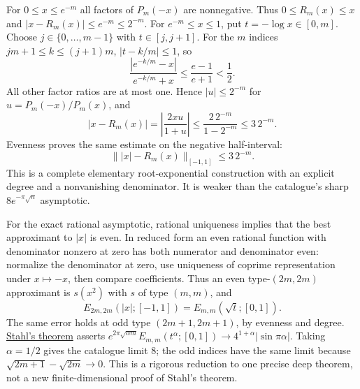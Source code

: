 \documentclass[11pt]{article}
\theoremstyle{remark}
\numberwithin{equation}{section}
\begin{document}
For $0\le x\le e^{-m}$ all factors of $P_m(-x)$ are nonnegative.
Thus $0\le R_m(x)\le x$ and $|x-R_m(x)|\le e^{-m}\le2^{-m}$.
For $e^{-m}\le x\le1$, put $t=-\log x\in[0,m]$.
Choose $j\in\{0,\ldots,m-1\}$ with $t\in[j,j+1]$.
For the $m$ indices $jm+1\le k\le(j+1)m$, $|t-k/m|\le1$, so
\[
 \frac{|e^{-k/m}-x|}{e^{-k/m}+x}
 \le\frac{e-1}{e+1}<\frac12.
\]
All other factor ratios are at most one. Hence
$|u|\le2^{-m}$ for $u=P_m(-x)/P_m(x)$, and
\[
 |x-R_m(x)|=\left|\frac{2xu}{1+u}\right|
 \le\frac{2\,2^{-m}}{1-2^{-m}}\le3\,2^{-m}.
\]
Evenness proves the same estimate on the negative half-interval:
\begin{equation}\label{polyroot:newman-simple}
 \||x|-R_m(x)\|_{[-1,1]}\le3\,2^{-m}.
\end{equation}
This is a complete elementary root-exponential construction with an
explicit degree and a nonvanishing denominator. It is weaker than the
catalogue's sharp $8e^{-\pi\sqrt n}$ asymptotic.

For the exact rational asymptotic, rational uniqueness implies that the
best approximant to $|x|$ is even. In reduced form an even rational
function with denominator nonzero at zero has both numerator and
denominator even: normalize the denominator at zero, use uniqueness of
coprime representation under $x\mapsto-x$, then compare coefficients.
Thus an even type-$(2m,2m)$ approximant is $s(x^2)$ with $s$ of type
$(m,m)$, and
\[
 E_{2m,2m}(|x|;[-1,1])=E_{m,m}(\sqrt t;[0,1]).
\]
The same error holds at odd type $(2m+1,2m+1)$, by evenness and degree.
\href{https://arxiv.org/abs/math/9301217}{Stahl's theorem}
asserts
$e^{2\pi\sqrt{\alpha m}}E_{m,m}(t^\alpha;[0,1])
\to4^{1+\alpha}|\sin\pi\alpha|$.
Taking $\alpha=1/2$ gives the catalogue limit $8$; the odd indices have
the same limit because $\sqrt{2m+1}-\sqrt{2m}\to0$.
This is a rigorous reduction to one precise deep theorem, not a new
finite-dimensional proof of Stahl's theorem.
\end{document}
